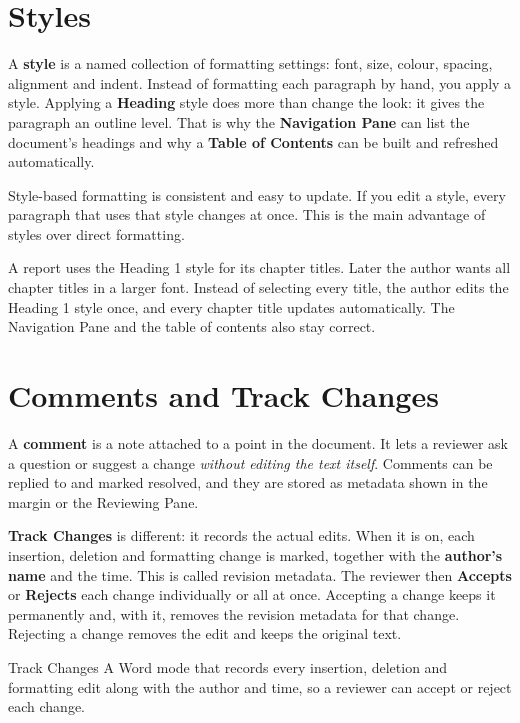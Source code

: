 \section{Styles}
A \textbf{style} is a named collection of formatting settings: font, size,
colour, spacing, alignment and indent. Instead of formatting each paragraph by
hand, you apply a style. Applying a \textbf{Heading} style does more than
change the look: it gives the paragraph an outline level. That is why the
\textbf{Navigation Pane} can list the document's headings and why a
\textbf{Table of Contents} can be built and refreshed automatically.

Style-based formatting is consistent and easy to update. If you edit a style,
every paragraph that uses that style changes at once. This is the main
advantage of styles over direct formatting.

\begin{example}
A report uses the Heading 1 style for its chapter titles. Later the author
wants all chapter titles in a larger font. Instead of selecting every title,
the author edits the Heading 1 style once, and every chapter title updates
automatically. The Navigation Pane and the table of contents also stay correct.
\end{example}

\section{Comments and Track Changes}
A \textbf{comment} is a note attached to a point in the document. It lets a
reviewer ask a question or suggest a change \emph{without editing the text
itself}. Comments can be replied to and marked resolved, and they are stored as
metadata shown in the margin or the Reviewing Pane.

\textbf{Track Changes} is different: it records the actual edits. When it is
on, each insertion, deletion and formatting change is marked, together with the
\textbf{author's name} and the time. This is called revision metadata. The
reviewer then \textbf{Accepts} or \textbf{Rejects} each change individually or
all at once. Accepting a change keeps it permanently and, with it, removes the
revision metadata for that change. Rejecting a change removes the edit and
keeps the original text.

\begin{definitionbox}{Track Changes}
A Word mode that records every insertion, deletion and formatting edit along
with the author and time, so a reviewer can accept or reject each change.
\end{definitionbox}


